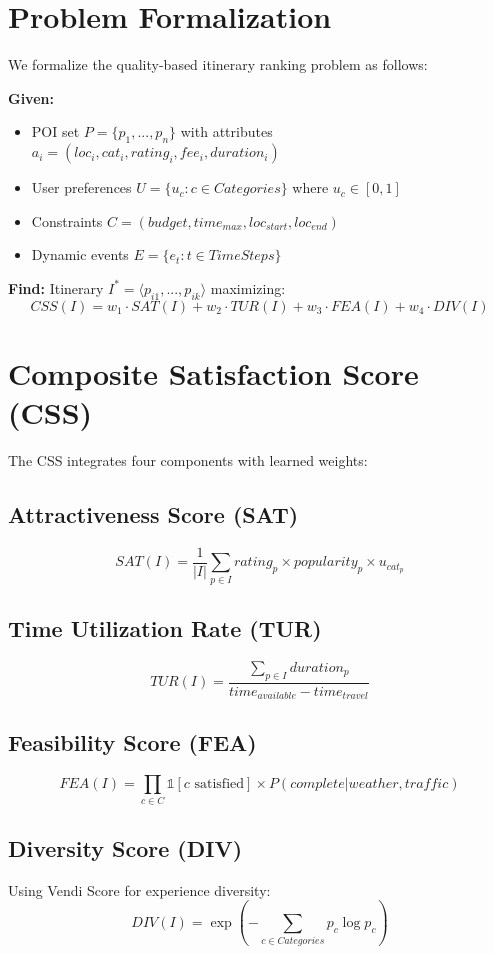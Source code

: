 
\section{Problem Formalization}

We formalize the quality-based itinerary ranking problem as follows:

\textbf{Given:}
\begin{itemize}
    \item POI set $P = \{p_1, ..., p_n\}$ with attributes $a_i = (loc_i, cat_i, rating_i, fee_i, duration_i)$
    \item User preferences $U = \{u_c : c \in Categories\}$ where $u_c \in [0,1]$
    \item Constraints $C = (budget, time_{max}, loc_{start}, loc_{end})$
    \item Dynamic events $E = \{e_t : t \in TimeSteps\}$
\end{itemize}

\textbf{Find:} Itinerary $I^* = \langle p_{i1}, ..., p_{ik} \rangle$ maximizing:
$$CSS(I) = w_1 \cdot SAT(I) + w_2 \cdot TUR(I) + w_3 \cdot FEA(I) + w_4 \cdot DIV(I)$$

\section{Composite Satisfaction Score (CSS)}

The CSS integrates four components with learned weights:

\subsection{Attractiveness Score (SAT)}
$$SAT(I) = \frac{1}{|I|} \sum_{p \in I} rating_p \times popularity_p \times u_{cat_p}$$

\subsection{Time Utilization Rate (TUR)}
$$TUR(I) = \frac{\sum_{p \in I} duration_p}{time_{available} - time_{travel}}$$

\subsection{Feasibility Score (FEA)}
$$FEA(I) = \prod_{c \in C} \mathbb{1}[c \text{ satisfied}] \times P(complete|weather, traffic)$$

\subsection{Diversity Score (DIV)}
Using Vendi Score for experience diversity:
$$DIV(I) = \exp\left(-\sum_{c \in Categories} p_c \log p_c\right)$$

